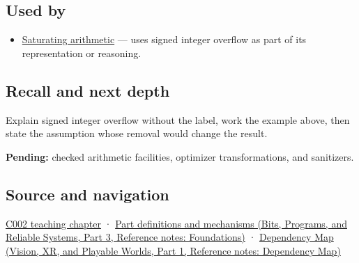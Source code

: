 \subsection{Used by}\label{appendix-1a599c924a4e-used-by}

\hypertarget{appendix-1a599c924a4e-used-by}{}

\begin{itemize}
\tightlist
\item
  \hyperref[appendix-3999c6209649]{Saturating arithmetic} --- uses signed integer overflow as part of its representation or reasoning.
\end{itemize}

\subsection{Recall and next depth}\label{appendix-1a599c924a4e-recall-and-next-depth}

\hypertarget{appendix-1a599c924a4e-recall-and-next-depth}{}

Explain signed integer overflow without the label, work the example above, then state the assumption whose removal would change the result.

\textbf{Pending:} checked arithmetic facilities, optimizer transformations, and sanitizers.

\subsection{Source and navigation}\label{appendix-1a599c924a4e-source-and-navigation}

\hypertarget{appendix-1a599c924a4e-source-and-navigation}{}

\hyperref[01-foundations-i-ch001-arithmetic-becomes-a-policy]{C002 teaching chapter} · \href{../01-Bits-Programs-and-Reliable-Systems-P03/main.pdf\#appendix-fd090d982a15}{Part definitions and mechanisms (Bits, Programs, and Reliable Systems, Part 3, Reference notes: Foundations)} · \href{../07-Vision-XR-and-Playable-Worlds-P01/main.pdf\#appendix-4ad47bdd269a}{Dependency Map (Vision, XR, and Playable Worlds, Part 1, Reference notes: Dependency Map)}
